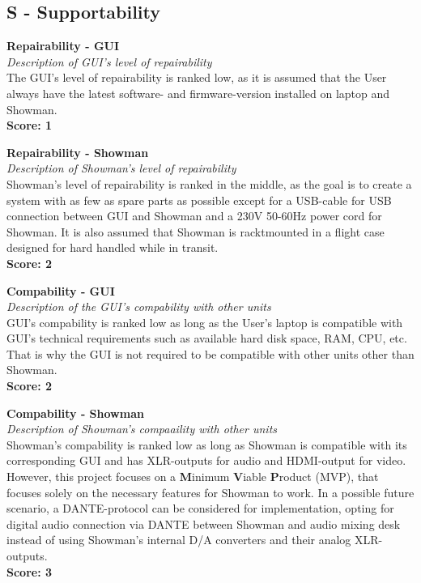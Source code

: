 \subsection{\textbf{S} - Supportability}
\textbf{Repairability - GUI} \\
\textit{Description of GUI's level of repairability} \\
The GUI's level of repairability is ranked low, as it is assumed that the User always have the latest software- and firmware-version installed on laptop and Showman. \\
\textbf{Score: 1} \newline

\textbf{Repairability - Showman} \\
\textit{Description of Showman's level of repairability} \\
Showman's level of repairability is ranked in the middle, as the goal is to create a system with as few as spare parts as possible except for a USB-cable for USB connection between GUI and Showman and a 230V 50-60Hz power cord for Showman. It is also assumed that Showman is racktmounted in a flight case designed for hard handled while in transit. \\
\textbf{Score: 2} \newline

\textbf{Compability - GUI} \\
\textit{Description of the GUI's compability with other units} \\
GUI's compability is ranked low as long as the User's laptop is compatible with GUI's technical requirements such as available hard disk space, RAM, CPU, etc. That is why the GUI is not required to be compatible with other units other than Showman. \\
\textbf{Score: 2} \newline

\textbf{Compability - Showman} \\
\textit{Description of Showman's compaaility with other units} \\
Showman's compability is ranked low as long as Showman is compatible with its corresponding GUI and has XLR-outputs for audio and HDMI-output for video. However, this project focuses on a \textbf{M}inimum \textbf{V}iable \textbf{P}roduct (MVP), that focuses solely on the necessary features for Showman to work. In a possible future scenario, a DANTE-protocol can be considered for implementation, opting for digital audio connection via DANTE between Showman and audio mixing desk instead of using Showman's internal D/A converters and their analog XLR-outputs. \\
\textbf{Score: 3} \newline

